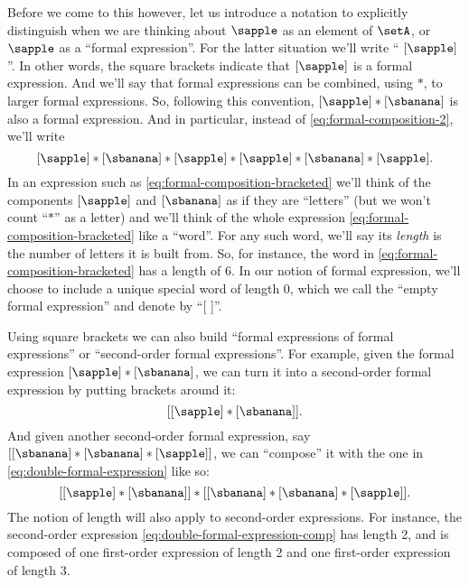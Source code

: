 Before we come to this however, let us introduce a notation to explicitly distinguish when we are thinking about $\sapple$ as an element of $\setA$, or $\sapple$ as a ``formal expression''.
For the latter situation we'll write `` $[\sapple]$ ''.
In other words, the square brackets indicate that $[\sapple]$ is a formal expression.
And we'll say that formal expressions can be combined, using $*$, to larger formal expressions.
So, following this convention, $[\sapple] * [\sbanana]$ is also a formal expression.
And in particular, instead of \cref{eq:formal-composition-2}, we'll write
\begin{equation}
	\label{eq:formal-composition-bracketed}
	[\sapple] * [\sbanana] * [\sapple] * [\sapple] * [\sbanana] * [\sapple].
\end{equation}
%
In an expression such as \cref{eq:formal-composition-bracketed} we'll think of the components $[\sapple]$ and $[\sbanana]$ as if they are ``letters'' (but we won't count ``$*$'' as a letter) and we'll think of the whole expression \cref{eq:formal-composition-bracketed} like a ``word''.
For any such word, we'll say its \emph{length} is the number of letters it is built from.
So, for instance, the word in \cref{eq:formal-composition-bracketed} has a length of $6$.
In our notion of formal expression, we'll choose to include a unique special word of length $0$, which we call the ``empty formal expression'' and denote by ``[ ]''.

Using square brackets we can also build ``formal expressions of formal expressions'' or ``second-order formal expressions''.
For example, given the formal expression $[\sapple] * [\sbanana]$, we can turn it into a second-order formal expression by putting brackets around it:
\begin{equation}
	\label{eq:double-formal-expression}
	[[\sapple] * [\sbanana]].
\end{equation}
And given another second-order formal expression, say $[[\sbanana] * [\sbanana] * [\sapple]]$, we can ``compose'' it with the one in \cref{eq:double-formal-expression} like so:
\begin{equation}
	\label{eq:double-formal-expression-comp}
	[[\sapple] * [\sbanana]] * [[\sbanana] * [\sbanana] * [\sapple]].
\end{equation}
The notion of length will also apply to second-order expressions.
For instance, the second-order expression \cref{eq:double-formal-expression-comp} has length 2, and is composed of one first-order expression of length 2 and one first-order expression of length 3.

